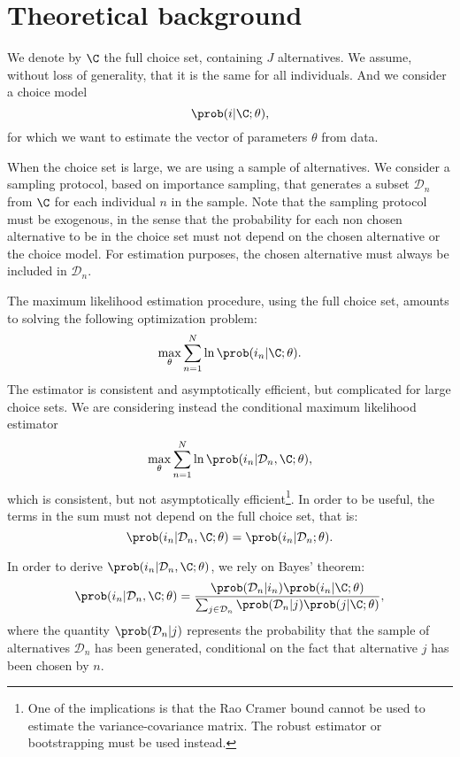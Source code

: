 \documentclass[12pt,a4paper]{article}
\newcommand{\D}{\mathcal{D}}
\begin{document}



\appendix
\section{Theoretical background}
\label{app:theory}

We denote by $\C$ the full choice set, containing $J$ alternatives. We
assume, without loss of generality, that it is the same for all
individuals. And we consider a choice model
\[
\prob(i | \C; \theta),
\]
for which we want to estimate the vector of parameters $\theta$ from data.

When the choice set is large, we are using a sample of
alternatives. We consider a sampling protocol, based on importance
sampling, that generates a subset $\D_n$ from $\C$ for each individual
$n$ in the sample.  Note that the sampling protocol must be exogenous,
in the sense that the probability for each non chosen alternative to
be in the choice set must not depend on the chosen alternative or the
choice model. For estimation purposes, the chosen alternative must
always be included in $\D_n$.

The maximum likelihood estimation procedure, using the full choice
set, amounts to solving the following optimization problem:
\begin{equation}
  \max_{\theta} \sum_{n=1}^N \ln \prob(i_n | \C; \theta).
\end{equation}
The estimator is consistent and asymptotically efficient, but complicated for large choice sets. We are considering instead the conditional maximum likelihood estimator
\begin{equation}
  \max_{\theta} \sum_{n=1}^N \ln \prob(i_n | \D_n, \C; \theta),
\end{equation}
which is consistent, but not asymptotically efficient\footnote{One of the implications is that the Rao Cramer bound cannot be used to estimate the variance-covariance matrix. The robust estimator or bootstrapping must be used instead.}.
In order to be useful, the terms in the sum must not depend on the full choice set, that is:
\[
\prob(i_n | \D_n, \C; \theta) = \prob(i_n | \D_n; \theta).
\]

In order to derive $\prob(i_n | \D_n, \C; \theta)$, we rely on Bayes' theorem:
\begin{equation}
  \label{eq:cond_maxlike}
\prob(i_n | \mathcal{D}_n, \C; \theta)
= \frac{\prob(\mathcal{D}_n | i_n) \prob(i_n | \C; \theta)}{\sum_{j\in\mathcal{D}_n}\prob(\mathcal{D}_n | j) \prob(j | \C; \theta)},
\end{equation}
where the quantity $\prob(\mathcal{D}_n | j)$ represents the probability that the sample of alternatives $\D_n$ has been generated, conditional on the fact that alternative $j$ has been chosen by $n$.
\end{document}
